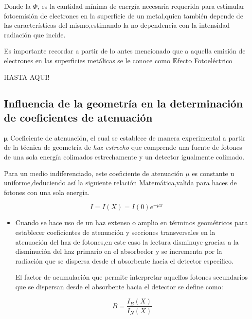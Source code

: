 \documentclass[12pt,fleqn]{book} %
\numberwithin{equation}{section} %
\numberwithin{figure}{section} %
\numberwithin{table}{section} %
\begin{document}
{Donde la $\Phi$, es la cantidad mínima de energía necesaria requerida para estimular fotoemisión de electrones en la superficie de un metal,quien también depende de las características del mismo,estimando la no dependencia con la intensidad  radiación que incide.

Es importante recordar a partir de lo antes mencionado que a aquella emisión de electrones en las superficies metálicas se le conoce como \textbf Efecto Fotoeléctrico

HASTA AQUI!




\subsection{Influencia de la geometría en la determinación de coeficientes de atenuación}


$\bm \mu $ Coeficiente de atenuación, el cual se establece de  manera experimental a partir de la técnica de geometría de \textit{haz estrecho} que comprende una fuente de fotones de una sola energía colimados estrechamente y un detector igualmente colimado.

Para un medio indiferenciado, este coeficiente de atenuación  $\mu$ es constante u uniforme,deduciendo así la siguiente relación Matemática,valida para haces de fotones con una sola energía.

\begin{equation}
I={I(X)}= I(0)e^{-\mu x}
\end{equation}



\begin{itemize}
 \item 
Cuando se hace uso de un haz extenso o amplio en términos geométricos para establecer coeficientes de atenuación y secciones transversales en la atenuación del haz de fotones,en este caso la lectura disminuye gracias a la disminución del haz primario en el absorbedor y se incrementa por la radiación que se dispersa desde el absorbente hacia el detector especifico.


El factor de acumulación que permite interpretar aquellos fotones secundarios que se dispersan desde el absorbente hacia el detector se define como:

\begin{equation}
 B=\frac{I_{B}(X)}{I_{N}(X)}
\end{equation}

\begin{itemize}


\end{itemize}
\end{itemize}}
\end{document}
